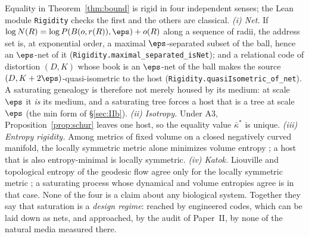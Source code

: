 
\begin{remark}\label{rem:rigidity}
Equality in Theorem~\ref{thm:bound} is rigid in four independent senses; the Lean module \texttt{Rigidity} checks the
first and the others are classical.
\emph{(i) Net.} If $\log N(R)=\log P(B(o,r(R)),\eps)+o(R)$ along a sequence of radii, the address set is, at
exponential order, a maximal $\eps$-separated subset of the ball, hence an $\eps$-net of it
(\texttt{Rigidity.maximal\_separated\_isNet}); and a relational code of distortion $(D,K)$ whose book is an $\eps$-net
of the ball makes the source $(D,K+2\eps)$-quasi-isometric to the host (\texttt{Rigidity.quasiIsometric\_of\_net}). A
saturating genealogy is therefore not merely housed by its medium: at scale $\eps$ it \emph{is} its medium, and a
saturating tree forces a host that is a tree at scale $\eps$ (the min form of \S\ref{sec:IIb}).
\emph{(ii) Isotropy.} Under A3, Proposition~\ref{prop:schur} leaves one host, so the equality value $\bar\kappa^*$ is
unique.
\emph{(iii) Entropy rigidity.} Among metrics of fixed volume on a closed negatively curved manifold, the locally
symmetric metric alone minimizes volume entropy \cite{bcg1995}; a host that is also entropy-minimal is locally
symmetric.
\emph{(iv) Katok.} Liouville and topological entropy of the geodesic flow agree only for the locally symmetric metric
\cite{katok1982}; a saturating process whose dynamical and volume entropies agree is in that case.
None of the four is a claim about any biological system. Together they say that saturation is a \emph{design regime}:
reached by engineered codes, which can be laid down as nets, and approached, by the audit of Paper~II, by none of the
natural media measured there.
\end{remark}


